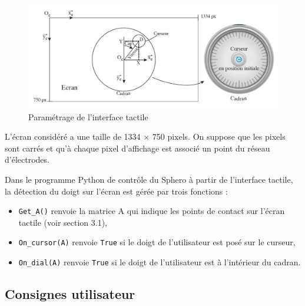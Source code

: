 \begin{figure}[!ht]\begin{center}
 \includegraphics[width=0.8\linewidth]{img/figure_7}
 \caption{Paramétrage de l'interface tactile}
 \label{fig7}
\end{center}\end{figure}

L'écran considéré a une taille de 1334 × 750 pixels. On suppose que les pixels sont carrés et qu'à chaque pixel d'affichage est associé un point du réseau d'électrodes. 





\newpage

Dans le programme Python de contrôle du Sphero à partir de l'interface tactile, la détection du doigt sur l'écran est gérée par trois fonctions :
\begin{itemize}
 \item \verb?Get_A()? renvoie la matrice A qui indique les points de contact sur l'écran tactile (voir section 3.1),
 \item \verb?On_cursor(A)? renvoie \verb?True? si le doigt de l'utilisateur est posé sur le curseur,
 \item  \verb?On_dial(A)? renvoie \verb?True? si le doigt de l'utilisateur est à l'intérieur du cadran.
\end{itemize}

\subsection{Consignes utilisateur}

